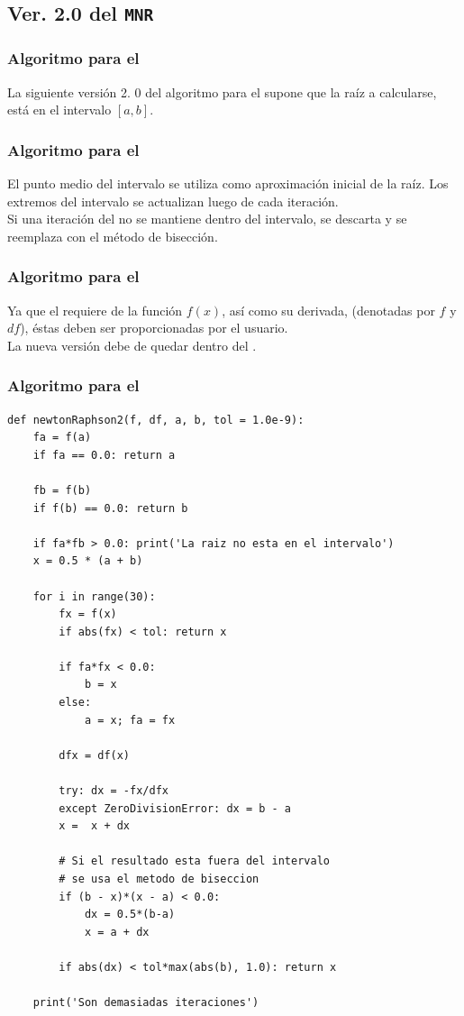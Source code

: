 \documentclass[12pt]{beamer}
\begin{document}
\subsection{Ver. 2.0 del \texttt{MNR}}

\begin{frame}
\frametitle{Algoritmo para el }
La siguiente versión 2. 0 del algoritmo para el  supone que la raíz a calcularse, está en el intervalo $[a, b]$.
\end{frame}
\begin{frame}
\frametitle{Algoritmo para el }
El punto medio del intervalo se utiliza como aproximación inicial de la raíz. \pause Los extremos del intervalo se actualizan luego de cada iteración.
\\
\bigskip
\pause
Si una iteración del  no se mantiene dentro del intervalo, se descarta y se reemplaza con el método de bisección.
\end{frame}
\begin{frame}
\frametitle{Algoritmo para el }
Ya que el  requiere de la función $ f(x)$, así como su derivada, (denotadas por $f$ y $df$), \pause éstas deben ser proporcionadas por el usuario.
\\
\bigskip
\pause
La nueva versión debe de quedar dentro del .
\end{frame}
\begin{frame}
\frametitle{Algoritmo para el }
\begin{lstlisting}[caption=Código para la segunda versión del MNR]
def newtonRaphson2(f, df, a, b, tol = 1.0e-9):
    fa = f(a)
    if fa == 0.0: return a

    fb = f(b)
    if f(b) == 0.0: return b

    if fa*fb > 0.0: print('La raiz no esta en el intervalo')
    x = 0.5 * (a + b)

    for i in range(30):
        fx = f(x)
        if abs(fx) < tol: return x

        if fa*fx < 0.0:
            b = x
        else:
            a = x; fa = fx

        dfx = df(x)
        
        try: dx = -fx/dfx
        except ZeroDivisionError: dx = b - a
        x =  x + dx
        
        # Si el resultado esta fuera del intervalo
        # se usa el metodo de biseccion
        if (b - x)*(x - a) < 0.0:
            dx = 0.5*(b-a)
            x = a + dx
        
        if abs(dx) < tol*max(abs(b), 1.0): return x
    
    print('Son demasiadas iteraciones')
\end{lstlisting}
\end{frame}
\end{document}
